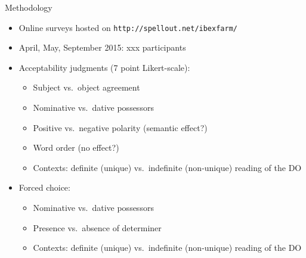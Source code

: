 \documentclass[12pt]{beamer}
\begin{document}
\begin{frame}{Methodology}

    \begin{itemize}

        \item Online surveys hosted on \texttt{http://spellout.net/ibexfarm/}

        \item April, May, September 2015: xxx participants

        \item Acceptability judgments (7 point Likert-scale):

            \begin{itemize}

                \item Subject vs.~object agreement

                \item Nominative vs.~dative possessors

                \item Positive vs.~negative polarity (semantic effect?)

                \item Word order (no effect?)

                \item Contexts: definite (unique) vs.~indefinite (non-unique) reading of the DO

            \end{itemize}

        \item Forced choice:

            \begin{itemize}

                \item Nominative vs.~dative possessors

                \item Presence vs.~absence of determiner

                \item Contexts: definite (unique) vs.~indefinite (non-unique) reading of the DO

            \end{itemize}

    \end{itemize}

\end{frame}
\end{document}
